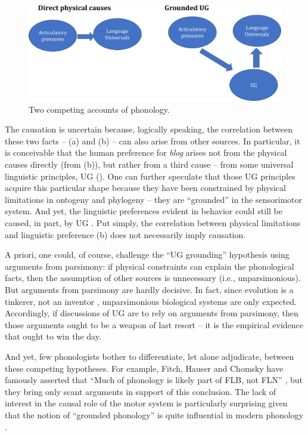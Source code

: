 \documentclass[output=paper,colorlinks,citecolor=brown
]{langscibook}
\begin{document}
\begin{figure}
    \centering
    \includegraphics[width=\textwidth,keepaspectratio]{figures/berent_figure4.jpg}
    \caption{Two competing accounts of phonology.}
    \label{fig:figure4}
\end{figure}

\begin{sloppypar}
The causation is uncertain because, logically speaking, the correlation between these two facts -- (a) and (b) -- can also arise from other sources. In particular, it is conceivable that the human preference for \textit{blog} arises not from the physical causes directly (from (b)), but rather from a third cause -- from some universal linguistic principles, UG (). One can further speculate that those UG principles acquire this particular shape because they have been constrained by physical limitations in ontogeny and phylogeny -- they are ``grounded'' in the sensorimotor system. And yet, the linguistic preferences evident in behavior could still be caused, in part, by UG \citep{berent2013phonologicala}. Put simply, the correlation between physical limitations and linguistic preference (b) does not necessarily imply causation.
\end{sloppypar}

A priori, one could, of course, challenge the ``UG grounding'' hypothesis using arguments from parsimony: if physical constraints can explain the phonological facts, then the assumption of other sources is unnecessary (i.e., unparsimonious). But arguments from parsimony are hardly decisive. In fact, since evolution is a tinkerer, not an inventor \citep{jacob1977evolution}, unparsimonious biological systems are only expected. Accordingly, if discussions of UG are to rely on arguments from parsimony, then those arguments ought to be a weapon of last resort -- it is the empirical evidence that ought to win the day. 

And yet, few phonologists bother to differentiate, let alone adjudicate, between these competing hypotheses. For example, Fitch, Hauser and Chomsky have famously asserted that ``Much of phonology is likely part of FLB, not FLN'' \citep{fitch2005evolution}, but they bring only scant arguments in support of this conclusion. The lack of interest in the causal role of the motor system is particularly surprising given that the notion of ``grounded phonology'' is quite influential in modern phonology \citep{archangeli1994grounded,hayes2004phonetically}.
\end{document}
